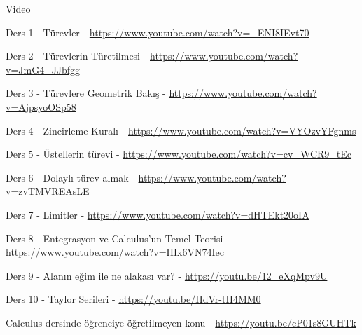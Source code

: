 \documentclass[12pt,fleqn]{article}\usepackage{../../common}
\begin{document}
Video

Ders 1 - Türevler - \url{https://www.youtube.com/watch?v=_ENI8IEvt70}

Ders 2 - Türevlerin Türetilmesi - \url{https://www.youtube.com/watch?v=JmG4_JJbfgg}

Ders 3 - Türevlere Geometrik Bakış - \url{https://www.youtube.com/watch?v=AjpsyoOSp58}

Ders 4 - Zincirleme Kuralı - \url{https://www.youtube.com/watch?v=VYOzvYFgnms}

Ders 5 - Üstellerin türevi - \url{https://www.youtube.com/watch?v=cv_WCR9_tEc}

Ders 6 - Dolaylı türev almak - \url{https://www.youtube.com/watch?v=zvTMVREAsLE}

Ders 7 - Limitler - \url{https://www.youtube.com/watch?v=dHTEkt20oIA}

Ders 8 -  Entegrasyon ve Calculus'un Temel Teorisi - \url{https://www.youtube.com/watch?v=HIx6VN74Iec}

Ders 9 - Alanın eğim ile ne alakası var? - \url{https://youtu.be/12_eXqMpv9U}

Ders 10 - Taylor Serileri - \url{https://youtu.be/HdVr-tH4MM0}

Calculus dersinde öğrenciye öğretilmeyen konu - \url{https://youtu.be/cP01s8GUHTk}
\end{document}
